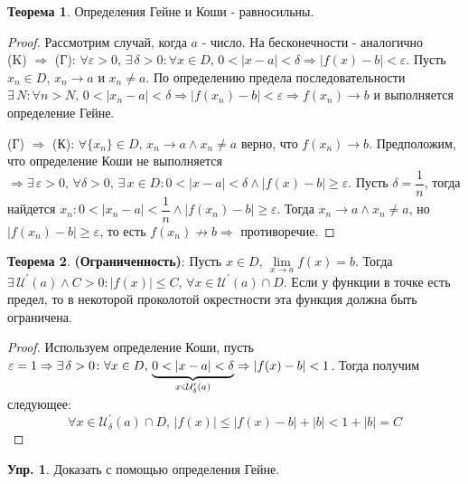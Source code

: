 \documentclass[12pt]{article}
\theoremstyle{definition}
\newtheorem{exrc}{Упр.}
\newtheorem{theorem}{Теорема}
\newcommand{\smallerrel}[1]{\mathrel{\mathpalette\smallerrelaux{#1}}}
\newcommand{\smallerrelaux}[2]{\raisebox{.1ex}{\scalebox{.75}{$#1#2$}}}
\newcommand{\smallin}{\smallerrel{\in}}
\begin{document}
\begin{theorem}
	Определения Гейне и Коши - равносильны.
\end{theorem}

\begin{proof}Рассмотрим случай, когда $a$ - число. На бесконечности - аналогично\\
	(K) $\Rightarrow$ (Г): $\forall \varepsilon > 0, \, \exists \, \delta > 0 \colon \forall x \in D, \, 0 < |x-a| < \delta \Rightarrow |f(x) -b| < \varepsilon$. Пусть $x_n \in D, \, x_n \to a$ и $x_n \neq a$. По определению предела последовательности $\exists \, N \colon \forall n > N, \, 0 < |x_n - a| < \delta \Rightarrow |f(x_n) - b | < \varepsilon \Rightarrow f(x_n) \to b$ и выполняется определение Гейне.
	
	(Г) $\Rightarrow$ (К): $\forall \{x_n\} \in D, \, x_n \to a \wedge x_n \neq a$ верно, что $f(x_n) \to b$. Предположим, что определение Коши не выполняется $\Rightarrow \exists \, \varepsilon > 0, \, \forall \delta > 0, \, \exists \, x \in D \colon 0 < |x - a| < \delta \wedge |f(x) - b| \geq \varepsilon$. Пусть $\delta = \dfrac{1}{n}$, тогда найдется $x_n \colon 0 < |x_n - a| < \dfrac{1}{n} \wedge |f(x_n) - b| \geq \varepsilon$. Тогда $x_n \to a \wedge x_n \neq a$, но $|f(x_n) - b| \geq \varepsilon$, то есть $f(x_n) \nrightarrow b \Rightarrow$ противоречие.
\end{proof}

\begin{theorem} \textbf{(Ограниченность)}:
	Пусть $x \in D, \, \lim\limits_{x \to a} f(x) = b$. Тогда $\exists \, \mathcal{U}^\prime(a) \wedge C > 0 \colon |f(x)| \leq C, \, \forall x \in \mathcal{U}^\prime(a) \cap D$. Если у функции в точке есть предел, то в некоторой проколотой окрестности эта функция должна быть ограничена.
\end{theorem}

\begin{proof}
	Используем определение Коши, пусть $\varepsilon = 1 \Rightarrow \exists \, \delta > 0  \colon \forall x \in D, \, \underbrace{0 < |x - a| < \delta}_{x \smallin \mathcal{U}_\delta^\prime(a)} \Rightarrow |f(x) - b| < 1$. Тогда получим следующее:
	$$\forall x \in \mathcal{U}_\delta^\prime(a) \cap D, \, |f(x)| \leq |f(x) - b| + |b| < 1 + |b| = C$$
\end{proof}

\begin{exrc}
	Доказать с помощью определения Гейне.
\end{exrc}
\end{document}
